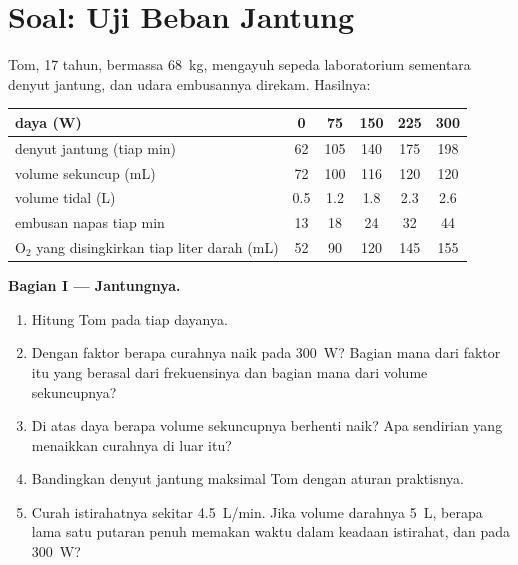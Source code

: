 \section{Soal: Uji Beban Jantung}

\begin{problem}
\label{pb:g10:heart-lungs-effort:1}
Tom, 17 tahun, bermassa \qty{68}{kg}, mengayuh sepeda laboratorium
sementara denyut jantung,  dan udara embusannya direkam. Hasilnya:

\begin{center}
\begin{tabular}{lccccc}
daya (W) & 0 & 75 & 150 & 225 & 300 \\ \hline
denyut jantung (tiap min) & 62 & 105 & 140 & 175 & 198 \\
volume sekuncup (mL) & 72 & 100 & 116 & 120 & 120 \\
volume tidal (L) & 0.5 & 1.2 & 1.8 & 2.3 & 2.6 \\
embusan napas tiap min & 13 & 18 & 24 & 32 & 44 \\
$\mathrm{O_2}$ yang disingkirkan tiap liter darah (mL) & 52 & 90 & 120 & 145 & 155 \\
\end{tabular}
\end{center}

\medskip
\noindent\textbf{Bagian I --- Jantungnya.}
\begin{enumerate}
  \item Hitung  Tom pada tiap dayanya.
  \item Dengan faktor berapa curahnya naik pada \qty{300}{W}? Bagian
        mana dari faktor itu yang berasal dari frekuensinya dan bagian
        mana dari volume sekuncupnya?
  \item Di atas daya berapa volume sekuncupnya berhenti naik? Apa
        sendirian yang menaikkan curahnya di luar itu?
  \item Bandingkan denyut jantung maksimal Tom dengan aturan praktisnya.
  \item Curah istirahatnya sekitar \qty{4.5}{L/min}. Jika volume
        darahnya \qty{5}{L}, berapa lama satu putaran penuh memakan
        waktu dalam keadaan istirahat, dan pada \qty{300}{W}?
\end{enumerate}


\end{problem}
